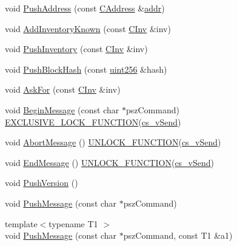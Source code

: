 \begin{DoxyCompactItemize}
void \mbox{\hyperlink{class_c_node_a06950a5ce265a1d4df1aad7f28e6fde8}{Push\+Address}} (const \mbox{\hyperlink{class_c_address}{C\+Address}} \&\mbox{\hyperlink{class_c_node_a3993ecb1de2a2135a3cf0904346a6f88}{addr}})
\item 
void \mbox{\hyperlink{class_c_node_ac3054eb6ade84e8968f032ce3e700f6a}{Add\+Inventory\+Known}} (const \mbox{\hyperlink{class_c_inv}{C\+Inv}} \&inv)
\item 
void \mbox{\hyperlink{class_c_node_a7cef2333aa8776127a7e7fcab659eb6a}{Push\+Inventory}} (const \mbox{\hyperlink{class_c_inv}{C\+Inv}} \&inv)
\item 
void \mbox{\hyperlink{class_c_node_aa3315bf026b3c2e27f222b5540c6d472}{Push\+Block\+Hash}} (const \mbox{\hyperlink{classuint256}{uint256}} \&hash)
\item 
void \mbox{\hyperlink{class_c_node_ae0def1498409407d1612833a7d38c875}{Ask\+For}} (const \mbox{\hyperlink{class_c_inv}{C\+Inv}} \&inv)
\item 
void \mbox{\hyperlink{class_c_node_af76d193027757002321d0d674290b955}{Begin\+Message}} (const char $\ast$psz\+Command) \mbox{\hyperlink{threadsafety_8h_a77729163b7f6867da40ad5daa5f926f3}{E\+X\+C\+L\+U\+S\+I\+V\+E\+\_\+\+L\+O\+C\+K\+\_\+\+F\+U\+N\+C\+T\+I\+ON}}(\mbox{\hyperlink{class_c_node_a79edcac83fc5067567c7b41c26fcc56f}{cs\+\_\+v\+Send}})
\item 
void \mbox{\hyperlink{class_c_node_aae0fdfe555001a60bab8f216c3bc3978}{Abort\+Message}} () \mbox{\hyperlink{threadsafety_8h_abd56e19f9b4781b1a5212a46951cf5c3}{U\+N\+L\+O\+C\+K\+\_\+\+F\+U\+N\+C\+T\+I\+ON}}(\mbox{\hyperlink{class_c_node_a79edcac83fc5067567c7b41c26fcc56f}{cs\+\_\+v\+Send}})
\item 
void \mbox{\hyperlink{class_c_node_af8d4b8c0f883afffcb62d906c31b2cdf}{End\+Message}} () \mbox{\hyperlink{threadsafety_8h_abd56e19f9b4781b1a5212a46951cf5c3}{U\+N\+L\+O\+C\+K\+\_\+\+F\+U\+N\+C\+T\+I\+ON}}(\mbox{\hyperlink{class_c_node_a79edcac83fc5067567c7b41c26fcc56f}{cs\+\_\+v\+Send}})
\item 
void \mbox{\hyperlink{class_c_node_a4dbfe4f6c1fd162aaa905e4bd201d536}{Push\+Version}} ()
\item 
void \mbox{\hyperlink{class_c_node_a204fda3d33404cb37698c085b1583ab2}{Push\+Message}} (const char $\ast$psz\+Command)
\item 
{\footnotesize template$<$typename T1 $>$ }\\void \mbox{\hyperlink{class_c_node_a07f897794e362a214a1d4d2aa3d68939}{Push\+Message}} (const char $\ast$psz\+Command, const T1 \&a1)
\item 

\end{DoxyCompactItemize}

